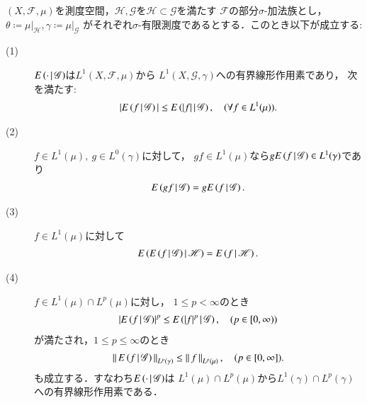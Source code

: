 	\begin{screen}
		\begin{thm}[条件付き期待値の性質]\label{thm:properties_of_conditional_expectations}
			$(X,\mathscr{F},\mu)$を測度空間，$\mathscr{H},\mathscr{G}$を$\mathscr{H} \subset \mathscr{G}$を満たす
			$\mathscr{F}$の部分$\sigma$-加法族とし，$\theta \coloneqq \left. \mu \right|_{\mathscr{H}},
			\gamma \coloneqq \left. \mu \right|_{\mathscr{G}}$
			がそれぞれ$\sigma$-有限測度であるとする．このとき以下が成立する:
			\begin{description}
				\item[(1)] $E\left( \cdot \, \middle|\, \mathscr{G} \right)$は$L^1(X,\mathscr{F},\mu)$から
					$L^1\left(X,\mathscr{G},\gamma\right)$への有界線形作用素であり，
					次を満たす:
					\begin{align}
						|E\left( f \, \middle|\, \mathscr{G} \right)| \leq E\left( |f| \, \middle|\, \mathscr{G} \right),
						\quad (\forall f \in L^1(\mu)).
						\label{eq:thm_properties_of_conditional_expectations_2}
					\end{align}
				
				\item[(2)] $f \in L^1(\mu),\ g \in L^0(\gamma)$に対して，
					$gf \in L^1(\mu)$なら$g E\left( f \, \middle|\, \mathscr{G} \right) \in L^1(\gamma)$であり
					\begin{align}
						E\left( gf \, \middle|\, \mathscr{G} \right) = gE\left( f \, \middle|\, \mathscr{G} \right).
						\label{eq:thm_properties_of_conditional_expectations_4}
					\end{align}
					
				\item[(3)] $f \in L^1(\mu)$に対して
					\begin{align}
						E\left( E\left( f \, \middle|\, \mathscr{G} \right) \, \middle|\, \mathscr{H} \right) = E\left( f \, \middle|\, \mathscr{H} \right).
					\end{align}
					
				\item[(4)] $f \in L^1(\mu) \cap L^p(\mu)$に対し，
					$1 \leq p < \infty$のとき
					\begin{align}
						\left| E\left( f \, \middle|\, \mathscr{G} \right) \right|^p
						\leq E\left( |f|^p \, \middle|\, \mathscr{G} \right),\quad (p \in [0,\infty))
					\end{align}
					が満たされ，$1 \leq p \leq \infty$のとき
					\begin{align}
						\left\|\, E\left( f \, \middle|\, \mathscr{G} \right)\, \right\|_{L^p(\gamma)}
						\leq \left\|\, f\, \right\|_{L^p(\mu)},\quad (p \in [0,\infty]).
						\label{eq:thm_properties_of_conditional_expectations_3}
					\end{align}
					も成立する．すなわち$E\left( \cdot \, \middle|\, \mathscr{G} \right)$は
					$L^1(\mu) \cap L^p(\mu)$から$L^1(\gamma) \cap L^p(\gamma)$
					への有界線形作用素である．
			\end{description}
		\end{thm}
	\end{screen}
	
